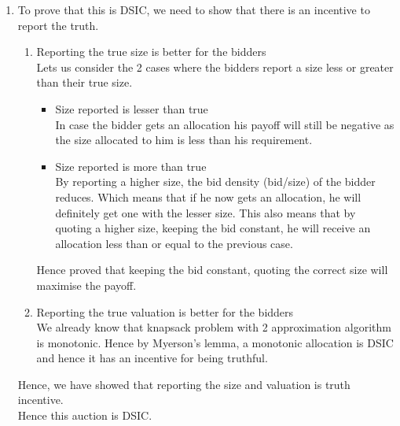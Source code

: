 \documentclass{article}
\begin{document}
\begin{enumerate}
\item %
	To prove that this is DSIC, we need to show that there is an incentive to report the truth.
	\begin{enumerate}
		\item Reporting the true size is better for the bidders \\
				Lets us consider the 2 cases where the bidders report a size less or greater than their true size.
				\begin{itemize}
					\item Size reported is lesser than true \\
						In case the bidder gets an allocation his payoff will still be negative as the size allocated to him is less than his requirement.
					\item Size reported is more than true \\
						By reporting a higher size, the bid density (bid/size) of the bidder reduces. Which means that if he now gets an allocation, he will definitely get one with the lesser size.
						This also means that by quoting a higher size, keeping the bid constant, he will receive an allocation less than or equal to the previous case.
				\end{itemize}
				Hence proved that keeping the bid constant, quoting the correct size will maximise the payoff.
		\item Reporting the true valuation is better for the bidders \\
				We already know that knapsack problem with 2 approximation algorithm is monotonic. Hence by Myerson's lemma, a monotonic allocation is DSIC and hence it has an incentive for being truthful.
	\end{enumerate}
	Hence, we have showed that reporting the size and valuation is truth incentive. \\
	Hence this auction is DSIC.

\end{enumerate}
\end{document}
